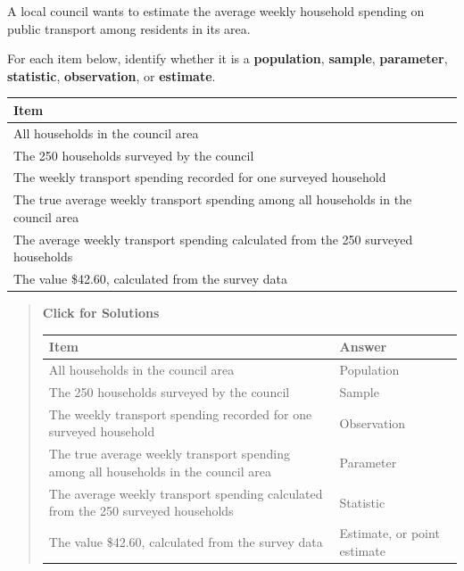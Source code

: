 \documentclass[
  letterpaper,
  DIV=11,
  numbers=noendperiod]{scrreprt}
\begin{document}
\begin{tcolorbox}[enhanced jigsaw, arc=.35mm, bottomrule=.15mm, bottomtitle=1mm, breakable, colback=white, colbacktitle=quarto-callout-note-color!10!white, colframe=quarto-callout-note-color-frame, coltitle=black, left=2mm, leftrule=.75mm, opacityback=0, opacitybacktitle=0.6, rightrule=.15mm, title=\textcolor{quarto-callout-note-color}{\faInfo}\hspace{0.5em}{Question 1}, titlerule=0mm, toprule=.15mm, toptitle=1mm]

A local council wants to estimate the average weekly household spending
on public transport among residents in its area.

For each item below, identify whether it is a \textbf{population},
\textbf{sample}, \textbf{parameter}, \textbf{statistic},
\textbf{observation}, or \textbf{estimate}.

\begin{table}
\fontsize{12.0pt}{14.0pt}\selectfont
\begin{tabular*}{\linewidth}{@{\extracolsep{\fill}}l}
\toprule
Item \\ 
\midrule\addlinespace[2.5pt]
All households in the council area \\ 
The 250 households surveyed by the council \\ 
The weekly transport spending recorded for one surveyed household \\ 
The true average weekly transport spending among all households in the council area \\ 
The average weekly transport spending calculated from the 250 surveyed households \\ 
The value \$42.60, calculated from the survey data \\ 
\bottomrule
\end{tabular*}
\end{table}

\begin{quote}
\textbf{Click for Solutions}

\begin{table}
\fontsize{12.0pt}{14.0pt}\selectfont
\begin{tabular*}{\linewidth}{@{\extracolsep{\fill}}ll}
\toprule
Item & Answer \\ 
\midrule\addlinespace[2.5pt]
All households in the council area & Population \\ 
The 250 households surveyed by the council & Sample \\ 
The weekly transport spending recorded for one surveyed household & Observation \\ 
The true average weekly transport spending among all households in the council area & Parameter \\ 
The average weekly transport spending calculated from the 250 surveyed households & Statistic \\ 
The value \$42.60, calculated from the survey data & Estimate, or point estimate \\ 
\bottomrule
\end{tabular*}
\end{table}


\end{quote}
\end{tcolorbox}
\end{document}
